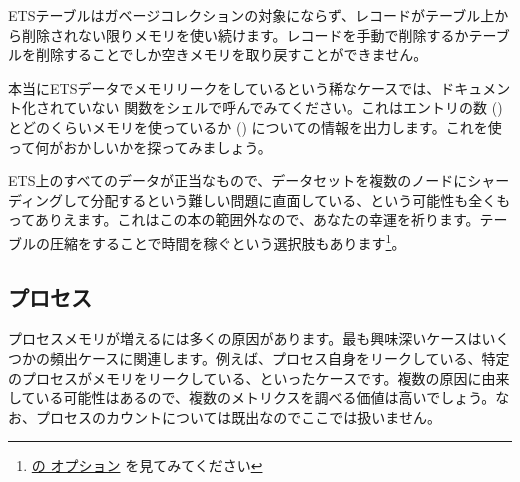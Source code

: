 ETSテーブルはガベージコレクションの対象にならず、レコードがテーブル上から削除されない限りメモリを使い続けます。レコードを手動で削除するかテーブルを削除することでしか空きメモリを取り戻すことができません。

本当にETSデータでメモリリークをしているという稀なケースでは、ドキュメント化されていない  関数をシェルで呼んでみてください。これはエントリの数 () とどのくらいメモリを使っているか () についての情報を出力します。これを使って何がおかしいかを探ってみましょう。

ETS上のすべてのデータが正当なもので、データセットを複数のノードにシャーディングして分配するという難しい問題に直面している、という可能性も全くもってありえます。これはこの本の範囲外なので、あなたの幸運を祈ります。テーブルの圧縮をすることで時間を稼ぐという選択肢もあります\footnote{\href{http://www.erlang.org/doc/man/ets.html\#new-2}{ の  オプション} を見てみてください}。

\subsection{プロセス}

プロセスメモリが増えるには多くの原因があります。最も興味深いケースはいくつかの頻出ケースに関連します。例えば、プロセス自身をリークしている、特定のプロセスがメモリをリークしている、といったケースです。複数の原因に由来している可能性はあるので、複数のメトリクスを調べる価値は高いでしょう。なお、プロセスのカウントについては既出なのでここでは扱いません。

